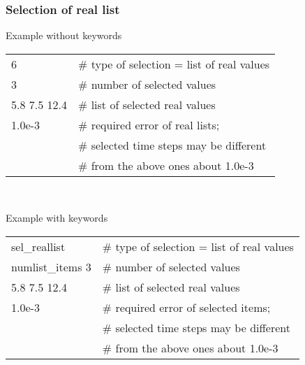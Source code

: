 \subsubsection{Selection of real list}
Example without keywords
\begin{center}
\begin{tabular}{|ll|}
\hline
6            & \# type of selection = list of real values \\ 
3            & \# number of selected values               \\
5.8 7.5 12.4 & \# list of selected real values            \\
1.0e-3       & \# required error of real lists;           \\
             & \# selected time steps may be different    \\
             & \# from the above ones about 1.0e-3        \\
\hline
\end{tabular}\\
\end{center}
Example with keywords
\begin{center}
\begin{tabular}{|ll|}
\hline
sel\_reallist    & \# type of selection = list of real values \\ 
numlist\_items 3 & \# number of selected values               \\
5.8 7.5 12.4     & \# list of selected real values            \\
1.0e-3           & \# required error of selected items;       \\
                 & \# selected time steps may be different    \\
                 & \# from the above ones about 1.0e-3        \\
\hline
\end{tabular}\\
\end{center}



